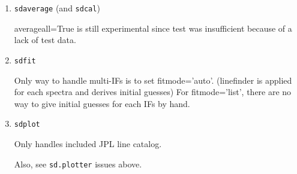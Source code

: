 \begin{enumerate}
\item {\tt sdaverage} (and {\tt sdcal})

  averageall=True is still experimental since test was insufficient 
  because of a lack of test data.

% 

\item {\tt sdfit}

%
Only way to handle multi-IFs is to set fitmode='auto'.
(linefinder is applied for each spectra and derives initial guesses)
For fitmode='list', there are no way to give initial guesses for each IFs by hand.

\item {\tt sdplot}

  Only handles included JPL line catalog.

  Also, see {\tt sd.plotter} issues above.

%

\end{enumerate}

